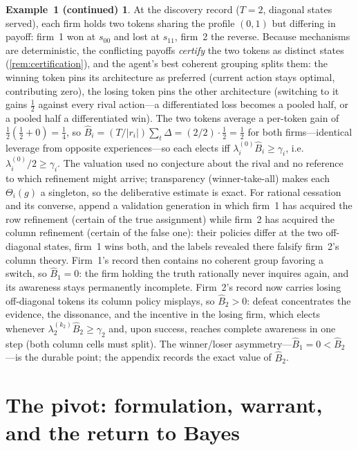 \documentclass[11pt]{article}
\theoremstyle{definition}
\newtheorem*{excont}{Example~1 (continued)}
\begin{document}
\begin{excont}
At the discovery record ($T=2$, diagonal states served), each firm holds two
tokens sharing the profile $(0,1)$ but differing in payoff: firm~1 won at
$s_{00}$ and lost at $s_{11}$, firm~2 the reverse.  Because mechanisms are
deterministic, the conflicting payoffs \emph{certify} the two tokens as
distinct states (\cref{rem:certification}), and the agent's best coherent
grouping splits them: the winning token pins its architecture as preferred
(current action stays optimal, contributing zero), the losing token pins the
other architecture (switching to it gains $\tfrac12$ against every rival
action---a differentiated loss becomes a pooled half, or a pooled half a
differentiated win).  The two tokens average a per-token gain of $\tfrac12(\tfrac12+0)=
\tfrac14$, so $\widehat B_i=(T/\lvert r_i\rvert)\sum_t\Delta=(2/2)\cdot
\tfrac12=\tfrac12$ for both firms---identical leverage from opposite
experiences---so each elects iff $\lambda_i^{(0)}\widehat B_i\geq\gamma_i$,
i.e.\ $\lambda_i^{(0)}/2\geq\gamma_i$.  The
valuation used no conjecture about the rival and no reference to which
refinement might arrive; transparency (winner-take-all) makes each
$\Theta_i(g)$ a singleton, so the deliberative estimate is exact.  For rational
cessation and its converse, append a validation generation in which firm~1 has
acquired the row refinement (certain of the true assignment) while firm~2 has
acquired the column refinement (certain of the false one): their policies
differ at the two off-diagonal states, firm~1 wins both, and the labels
revealed there falsify firm~2's column theory.  Firm~1's record then contains
no coherent group favoring a switch, so $\widehat B_1=0$: the firm holding the
truth rationally never inquires again, and its awareness stays permanently
incomplete.  Firm~2's record now carries losing off-diagonal tokens its column
policy misplays, so $\widehat B_2>0$: defeat concentrates the evidence, the
dissonance, and the incentive in the losing firm, which elects whenever
$\lambda_2^{(k_2)}\widehat B_2\geq\gamma_2$ and, upon success, reaches complete
awareness in one step (both column cells must split).  The winner/loser
asymmetry---$\widehat B_1=0<\widehat B_2$---is the durable point; the appendix
records the exact value of $\widehat B_2$.
\end{excont}
\section{The pivot: formulation, warrant, and the return to Bayes}
\label{sec:pivot}
\end{document}
